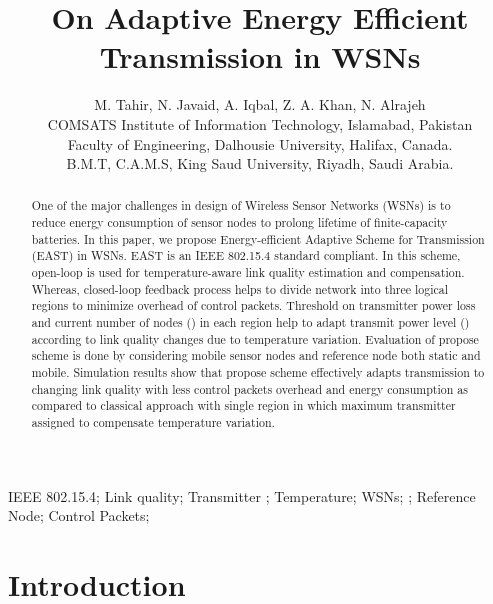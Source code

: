 \documentclass[12pt, conference, compsocconf, onecolumn, draftcls]{IEEEtran}
\begin{document}
\title{On Adaptive Energy Efficient\\ Transmission in WSNs}

\author{M. Tahir{}, N. Javaid{}, A. Iqbal{}, Z. A. Khan, N. Alrajeh\\
{}COMSATS Institute of Information Technology, Islamabad, Pakistan\\
Faculty of Engineering, Dalhousie University, Halifax, Canada.\\
B.M.T, C.A.M.S, King Saud University, Riyadh, Saudi Arabia.\\}

\maketitle
\IEEEpeerreviewmaketitle

\begin{abstract}
One of the major challenges in design of Wireless Sensor Networks (WSNs) is to reduce energy consumption of sensor nodes to prolong lifetime of finite-capacity batteries. In this paper, we propose Energy-efficient Adaptive Scheme for Transmission (EAST) in WSNs. EAST is an IEEE 802.15.4 standard compliant. In this scheme, open-loop is used for temperature-aware link quality estimation and compensation. Whereas, closed-loop feedback process helps to divide network into three logical regions to minimize overhead of control packets. Threshold on transmitter power loss  and current number of nodes () in each region help to adapt transmit power level () according to link quality changes due to temperature variation. Evaluation of propose scheme is done by considering  mobile sensor nodes and reference node both static and mobile. Simulation results show that propose scheme effectively adapts transmission  to changing link quality with less control packets overhead and energy consumption as compared to classical approach with single region in which maximum transmitter  assigned to compensate temperature variation.
\end{abstract}

\begin{keywords}
IEEE 802.15.4; Link quality; Transmitter ; Temperature; WSNs; ; Reference Node; Control Packets; 
\end{keywords}

\section{Introduction}
\end{document}
